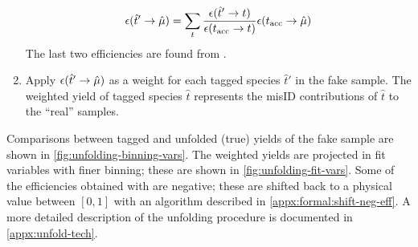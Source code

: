\begin{enumerate}
        \begin{equation}
            \misEff[\hat{t}']{\hat{\mu}} =
                \sum_{t}
                \frac{\misEff[\hat{t}']{t}}{\misEff[t_\text{acc}]{t}}
                \misEff[t_\text{acc}]{\hat{\mu}}
        \end{equation}
        The last two efficiencies are found from \pidcalib.

    \item Apply $\misEff[\hat{t}']{\hat{\mu}}$ as a weight for each
        tagged species $\hat{t}'$ in the fake \muon sample.
        The weighted yield of tagged species $\hat{t}$ represents the \muon misID
        contributions of $\hat{t}$ to the ``real'' \muon samples.
\end{enumerate}

Comparisons between tagged and unfolded (true) yields of the fake \muon sample
are shown in \cref{fig:unfolding-binning-vars}.
The weighted yields are projected in fit variables with finer binning;
these are shown in \cref{fig:unfolding-fit-vars}.
Some of the efficiencies obtained with \pidcalib are negative; these are shifted
back to a physical value between $[0, 1]$ with an algorithm described in
\cref{appx:formal:shift-neg-eff}.
A more detailed description of the unfolding procedure is documented in
\cref{appx:unfold-tech}.

